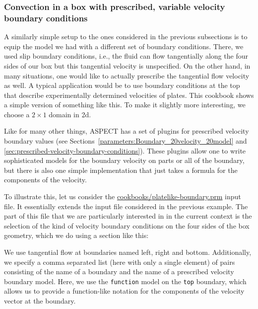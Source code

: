 \documentclass{article}
\newcommand{\aspect}{\textsc{ASPECT}}
\begin{document}
\subsubsection{Convection in a box with prescribed, variable velocity boundary conditions}
\label{sec:cookbooks-platelike}

A similarly simple setup to the ones considered in the previous subsections is
to equip the model we had with a different set of boundary conditions. There, we used slip boundary
conditions, i.e., the fluid can flow tangentially along the four sides of our
box but this tangential velocity is unspecified. On the other hand, in many
situations, one would like to actually prescribe the tangential flow velocity as
well. A typical application would be to use boundary conditions at the top that
describe experimentally determined velocities of plates. This cookbook shows a
simple version of something like this. To make it slightly more interesting, we
choose a $2\times 1$ domain in 2d.

Like for many other things, \aspect{} has a set of plugins for prescribed
velocity boundary values (see
Sections~\ref{parameters:Boundary_20velocity_20model} and
\ref{sec:prescribed-velocity-boundary-conditions}). These plugins allow one to
write sophisticated models for the boundary velocity on parts or all of the
boundary, but there is also one simple implementation that just takes a formula
for the components of the velocity.

To illustrate this, let us consider the \url{cookbooks/platelike-boundary.prm}
input file. It essentially extends the input file considered in the previous example.
The part of this file that we are particularly interested in in the current
context is the selection of the kind of velocity boundary conditions on the four
sides of the box geometry, which we do using a section like this:


We use tangential flow at boundaries named left, right and bottom.
Additionally, we specify a comma separated list (here with only a single
element) of pairs consisting of the name of a boundary and the name of a
prescribed velocity boundary model. Here, we use the \texttt{function} model on
the \texttt{top} boundary, which allows us to provide a function-like notation
for the components of the velocity vector at the boundary.
\end{document}
